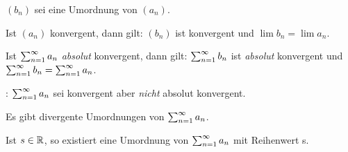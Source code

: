 \documentclass[a4paper,twoside,DIV15,BCOR12mm]{scrbook}
\begin{document}
\begin{satz}
$(b_n)$ sei eine Umordnung von $(a_n)$.
\begin{liste}
\item Ist $(a_n)$ konvergent, dann gilt: $(b_n)$ ist konvergent und $\lim{b_n} = \lim{a_n}$.

\item Ist $\sum_{n=1}^{\infty}{a_n}$ \emph{absolut} konvergent, dann gilt: $\sum_{n=1}^{\infty}{b_n}$ ist \emph{absolut} konvergent und $\sum_{n=1}^{\infty}{b_n} = \sum_{n=1}^{\infty}{a_n}$.

\item {}: $\sum_{n=1}^{\infty}{a_n}$ sei konvergent aber \emph{nicht} absolut konvergent.
\begin{liste}
\item Es gibt divergente Umordnungen von $\sum_{n=1}^{\infty}{a_n}$.
\item Ist $s\in\mathbb{R}$, so existiert eine Umordnung von $\sum_{n=1}^{\infty}{a_n}$ mit Reihenwert s.
\end{liste}
\end{liste}
\end{satz}
\end{document}
